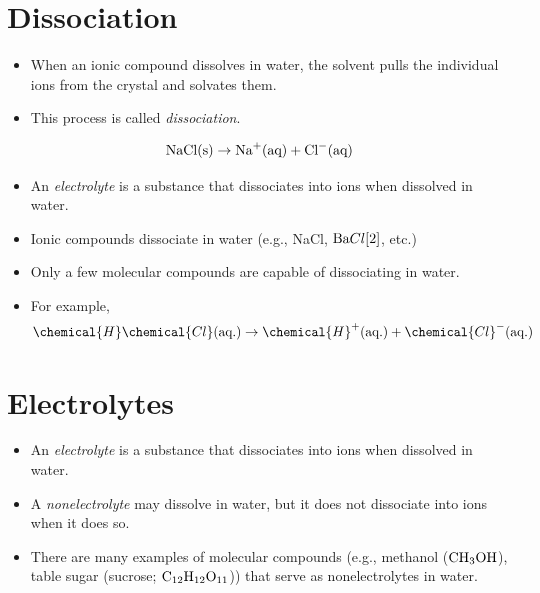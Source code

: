 \documentclass[
	chapter=4
]{chem122notes}
\begin{document}
\section{Dissociation}\label{sec:dissociation}
\begin{itemize}
	\item When an ionic compound dissolves in water, the solvent pulls the individual ions from the crystal and solvates them.
	\item This process is called \emph{dissociation}.
\end{itemize}
\[ \element{Na}\element{Cl} (\mbox{s}) \rightarrow \element{Na}^{+} (\mbox{aq}) + \element{Cl}^{-}(\mbox{aq}) \]
\begin{itemize}
	\item An \emph{electrolyte} is a substance that dissociates into ions when dissolved in water.
	\item Ionic compounds dissociate in water (e.g., NaCl, $\element{Ba}{Cl}[2]$, etc.)
	\item Only a few molecular compounds are capable of dissociating in water.
	\item For example, \[ \chemical{H}\chemical{Cl} (\mbox{aq.}) \rightarrow \chemical{H}^{+} (\mbox{aq.}) + \chemical{Cl}^{-} (\mbox{aq.}) \]
\end{itemize}

\section{Electrolytes}\label{sec:electrolytes}
\begin{itemize}
	\item An \emph{electrolyte} is a substance that dissociates into ions when dissolved in water.
	\item A \emph{nonelectrolyte} may dissolve in water, but it does not dissociate into ions when it does so.
	\item There are many examples of molecular compounds (e.g., methanol ($\element{C}\element{H}[3]\element{OH}$), table sugar (sucrose; $\element{C}[12]\element{H}[12]\element{O}[11]$)) that serve as nonelectrolytes in water.
\end{itemize}
\end{document}
